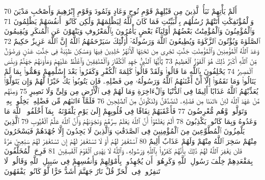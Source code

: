 {\tiny\colorbox{cl_aya}{70}} أَلَمْ يَأْتِهِمْ نَبَأُ ٱلَّذِينَ مِن قَبْلِهِمْ قَوْمِ نُوحٍ وَعَادٍ وَثَمُودَ وَقَوْمِ إِبْرَٰهِيمَ وَأَصْحَٰبِ مَدْيَنَ وَٱلْمُؤْتَفِكَٰتِ أَتَتْهُمْ رُسُلُهُم بِٱلْبَيِّنَٰتِ فَمَا كَانَ ٱللَّهُ لِيَظْلِمَهُمْ وَلَٰكِن كَانُوٓا۟ أَنفُسَهُمْ يَظْلِمُونَ
{\tiny\colorbox{cl_aya}{71}} وَٱلْمُؤْمِنُونَ وَٱلْمُؤْمِنَٰتُ بَعْضُهُمْ أَوْلِيَآءُ بَعْضٍ يَأْمُرُونَ بِٱلْمَعْرُوفِ وَيَنْهَوْنَ عَنِ ٱلْمُنكَرِ وَيُقِيمُونَ ٱلصَّلَوٰةَ وَيُؤْتُونَ ٱلزَّكَوٰةَ وَيُطِيعُونَ ٱللَّهَ وَرَسُولَهُۥٓ أُو۟لَٰٓئِكَ سَيَرْحَمُهُمُ ٱللَّهُ إِنَّ ٱللَّهَ عَزِيزٌ حَكِيمٌ
{\tiny\colorbox{cl_aya}{72}} وَعَدَ ٱللَّهُ ٱلْمُؤْمِنِينَ وَٱلْمُؤْمِنَٰتِ جَنَّٰتٍ تَجْرِى مِن تَحْتِهَا ٱلْأَنْهَٰرُ خَٰلِدِينَ فِيهَا وَمَسَٰكِنَ طَيِّبَةً فِى جَنَّٰتِ عَدْنٍ وَرِضْوَٰنٌ مِّنَ ٱللَّهِ أَكْبَرُ ذَٰلِكَ هُوَ ٱلْفَوْزُ ٱلْعَظِيمُ
{\tiny\colorbox{cl_aya}{73}} يَٰٓأَيُّهَا ٱلنَّبِىُّ جَٰهِدِ ٱلْكُفَّارَ وَٱلْمُنَٰفِقِينَ وَٱغْلُظْ عَلَيْهِمْ وَمَأْوَىٰهُمْ جَهَنَّمُ وَبِئْسَ ٱلْمَصِيرُ
{\tiny\colorbox{cl_aya}{74}} يَحْلِفُونَ بِٱللَّهِ مَا قَالُوا۟ وَلَقَدْ قَالُوا۟ كَلِمَةَ ٱلْكُفْرِ وَكَفَرُوا۟ بَعْدَ إِسْلَٰمِهِمْ وَهَمُّوا۟ بِمَا لَمْ يَنَالُوا۟ وَمَا نَقَمُوٓا۟ إِلَّآ أَنْ أَغْنَىٰهُمُ ٱللَّهُ وَرَسُولُهُۥ مِن فَضْلِهِۦ فَإِن يَتُوبُوا۟ يَكُ خَيْرًا لَّهُمْ وَإِن يَتَوَلَّوْا۟ يُعَذِّبْهُمُ ٱللَّهُ عَذَابًا أَلِيمًا فِى ٱلدُّنْيَا وَٱلْءَاخِرَةِ وَمَا لَهُمْ فِى ٱلْأَرْضِ مِن وَلِىٍّ وَلَا نَصِيرٍ
{\tiny\colorbox{cl_aya}{75}} وَمِنْهُم مَّنْ عَٰهَدَ ٱللَّهَ لَئِنْ ءَاتَىٰنَا مِن فَضْلِهِۦ لَنَصَّدَّقَنَّ وَلَنَكُونَنَّ مِنَ ٱلصَّٰلِحِينَ
{\tiny\colorbox{cl_aya}{76}} فَلَمَّآ ءَاتَىٰهُم مِّن فَضْلِهِۦ بَخِلُوا۟ بِهِۦ وَتَوَلَّوا۟ وَّهُم مُّعْرِضُونَ
{\tiny\colorbox{cl_aya}{77}} فَأَعْقَبَهُمْ نِفَاقًا فِى قُلُوبِهِمْ إِلَىٰ يَوْمِ يَلْقَوْنَهُۥ بِمَآ أَخْلَفُوا۟ ٱللَّهَ مَا وَعَدُوهُ وَبِمَا كَانُوا۟ يَكْذِبُونَ
{\tiny\colorbox{cl_aya}{78}} أَلَمْ يَعْلَمُوٓا۟ أَنَّ ٱللَّهَ يَعْلَمُ سِرَّهُمْ وَنَجْوَىٰهُمْ وَأَنَّ ٱللَّهَ عَلَّٰمُ ٱلْغُيُوبِ
{\tiny\colorbox{cl_aya}{79}} ٱلَّذِينَ يَلْمِزُونَ ٱلْمُطَّوِّعِينَ مِنَ ٱلْمُؤْمِنِينَ فِى ٱلصَّدَقَٰتِ وَٱلَّذِينَ لَا يَجِدُونَ إِلَّا جُهْدَهُمْ فَيَسْخَرُونَ مِنْهُمْ سَخِرَ ٱللَّهُ مِنْهُمْ وَلَهُمْ عَذَابٌ أَلِيمٌ
{\tiny\colorbox{cl_aya}{80}} ٱسْتَغْفِرْ لَهُمْ أَوْ لَا تَسْتَغْفِرْ لَهُمْ إِن تَسْتَغْفِرْ لَهُمْ سَبْعِينَ مَرَّةً فَلَن يَغْفِرَ ٱللَّهُ لَهُمْ ذَٰلِكَ بِأَنَّهُمْ كَفَرُوا۟ بِٱللَّهِ وَرَسُولِهِۦ وَٱللَّهُ لَا يَهْدِى ٱلْقَوْمَ ٱلْفَٰسِقِينَ
{\tiny\colorbox{cl_aya}{81}} فَرِحَ ٱلْمُخَلَّفُونَ بِمَقْعَدِهِمْ خِلَٰفَ رَسُولِ ٱللَّهِ وَكَرِهُوٓا۟ أَن يُجَٰهِدُوا۟ بِأَمْوَٰلِهِمْ وَأَنفُسِهِمْ فِى سَبِيلِ ٱللَّهِ وَقَالُوا۟ لَا تَنفِرُوا۟ فِى ٱلْحَرِّ قُلْ نَارُ جَهَنَّمَ أَشَدُّ حَرًّا لَّوْ كَانُوا۟ يَفْقَهُونَ
